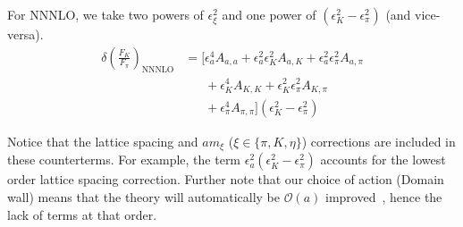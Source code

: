 \documentclass[prd,tightenlines,preprintnumbers,showpacs,superscriptaddress,notitlepage,eqsecnum,floatfix,notitlepage]{revtex4-1}
\begin{document}
For NNNLO, we take two powers of $\epsilon^2_\xi$ and one power of $(\epsilon_K^2 - \epsilon_\pi^2)$ (and vice-versa).
\begin{align}
\delta\left(\frac{F_K}{F_\pi}\right)_\text{NNNLO} &= \bigg[
\epsilon_a^4  A_{a, a} + \epsilon_a^2 \epsilon_K^2  A_{a, K} + \epsilon_a^2 \epsilon_\pi^2  A_{a, \pi} \\ \nonumber
&\phantom{[ =} + \epsilon_K^4  A_{K, K} + \epsilon_K^2 \epsilon_\pi^2  A_{K, \pi} \\ \nonumber
&\phantom{[ =} + \epsilon_\pi^4  A_{\pi, \pi} \bigg] (\epsilon_K^2 - \epsilon_\pi^2)
\end{align}

Notice that the lattice spacing and $am_\xi$ ($\xi \in \{\pi, K, \eta\}$) corrections are included in these counterterms. For example, the term $\epsilon^2_a (\epsilon^2_K - \epsilon^2_\pi)$ accounts for the lowest order lattice spacing correction. Further note that our choice of action (Domain wall) means that the theory will automatically be $\mathcal{O}(a)$ improved~\cite{Berkowitz:2017opd}, hence the lack of terms at that order.
\end{document}
